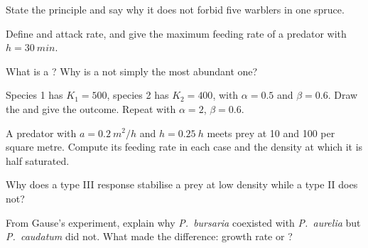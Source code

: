 \begin{exercise}[$\star$]\label{exo:b1:species-interactions:2}
State the  principle and say why it does not
forbid five warblers in one spruce.
\end{exercise}

\begin{exercise}[$\star$]\label{exo:b1:species-interactions:3}
Define  and attack rate, and give the maximum feeding
rate of a predator with $h = \qty{30}{min}$.
\end{exercise}

\begin{exercise}[$\star$]\label{exo:b1:species-interactions:4}
What is a ? Why is a  not simply the
most abundant one?
\end{exercise}

\begin{exercise}[$\star\star$]\label{exo:b1:species-interactions:5}
Species 1 has $K_1 = 500$, species 2 has $K_2 = 400$, with $\alpha =
0.5$ and $\beta = 0.6$. Draw the  and give the outcome.
Repeat with $\alpha = 2$, $\beta = 0.6$.
\end{exercise}

\begin{exercise}[$\star\star$]\label{exo:b1:species-interactions:6}
A predator with $a = \qty{0.2}{m^2/h}$ and $h = \qty{0.25}{h}$ meets
prey at \qty{10}{} and \qty{100}{} per square metre. Compute its
feeding rate in each case and the density at which it is half
saturated.
\end{exercise}

\begin{exercise}[$\star\star$]\label{exo:b1:species-interactions:7}
Why does a type III response stabilise a prey  at low
density while a type II does not?
\end{exercise}

\begin{exercise}[$\star\star$]\label{exo:b1:species-interactions:8}
From Gause's experiment, explain why \emph{P.~bursaria} coexisted
with \emph{P.~aurelia} but \emph{P.~caudatum} did not. What made the
difference: growth rate or ?
\end{exercise}


